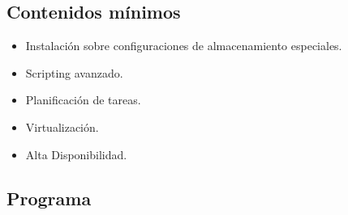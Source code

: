 \subsection{Contenidos mínimos}
\begin{itemize}
	\item  Instalación sobre configuraciones de almacenamiento especiales. 
	\item  Scripting avanzado. 
	\item  Planificación de tareas. 
	\item  Virtualización. 
	\item  Alta Disponibilidad.
\end{itemize}


\subsection {Programa}

